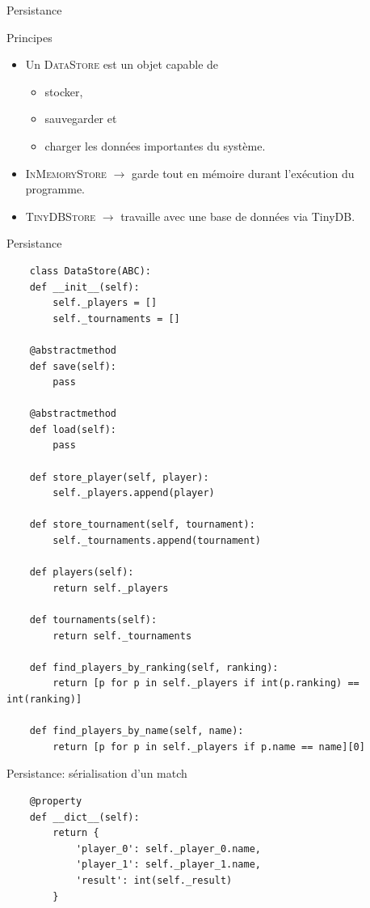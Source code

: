 \begin{frame}{Persistance}
  \begin{block}{Principes}
    \begin{itemize}
    \item Un \textsc{DataStore} est un objet capable de
      \begin{itemize}
      \item stocker,
      \item sauvegarder et
      \item charger les données importantes du système.
      \end{itemize}
    \item \textsc{InMemoryStore} $\rightarrow$ garde tout en mémoire
      durant l'exécution du programme.
    \item \textsc{TinyDBStore} $\rightarrow$ travaille avec une base
      de données via TinyDB.
    \end{itemize}
  \end{block}
\end{frame}

\begin{frame}[fragile]{Persistance}
  \tiny
  \begin{verbatim}
    class DataStore(ABC):
    def __init__(self):
        self._players = []
        self._tournaments = []

    @abstractmethod
    def save(self):
        pass

    @abstractmethod
    def load(self):
        pass

    def store_player(self, player):
        self._players.append(player)

    def store_tournament(self, tournament):
        self._tournaments.append(tournament)

    def players(self):
        return self._players

    def tournaments(self):
        return self._tournaments

    def find_players_by_ranking(self, ranking):
        return [p for p in self._players if int(p.ranking) == int(ranking)]

    def find_players_by_name(self, name):
        return [p for p in self._players if p.name == name][0]

  \end{verbatim}
\end{frame}

\begin{frame}[fragile]{Persistance: sérialisation d'un match}
  \footnotesize
  \begin{verbatim}
    @property
    def __dict__(self):
        return {
            'player_0': self._player_0.name,
            'player_1': self._player_1.name,
            'result': int(self._result)
        }
  \end{verbatim}
\end{frame}

